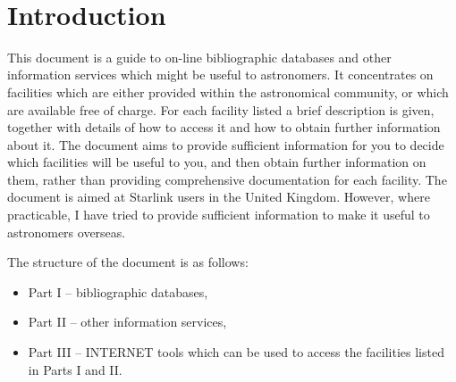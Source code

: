 \stardocabstract
 \newpage
 \begin{latexonly}
   \setlength{\parskip}{0mm}
   \latexonlytoc
   \setlength{\parskip}{\medskipamount}
   \markright{\stardocname}
 \end{latexonly}
\newpage
~
\newpage
\renewcommand{\thepage}{\arabic{page}}
\setcounter{page}{1}

\section{Introduction}

This document is a guide to on-line bibliographic databases and other 
information services which might be useful to astronomers. It 
concentrates on facilities which are either provided within the 
astronomical community, or which are available free of charge. For
each facility listed a brief description is given, together with details
of how to access it and how to obtain further information about it.
The document aims to provide sufficient information for you to decide 
which facilities will be useful to you, and then obtain further 
information on them, rather than providing comprehensive documentation 
for each facility. The document is aimed at Starlink users in the 
United Kingdom. However, where practicable, I have tried to provide 
sufficient information to make it useful to astronomers overseas. 

The structure of the document is as follows:

\begin{itemize}

  \item Part I -- bibliographic databases,

  \item Part II -- other information services,

  \item Part III -- INTERNET tools which can be used to access the
   facilities listed in Parts I and II.

\end{itemize}

